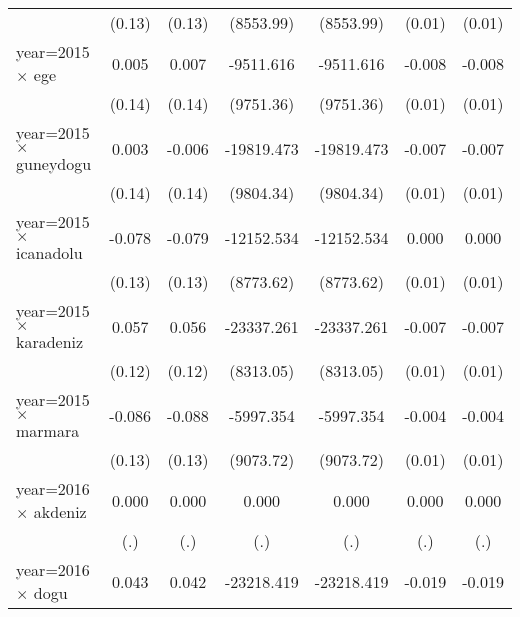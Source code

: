 {\begin{tabular}{l*{6}{c}}
                    &      (0.13)         &      (0.13)         &   (8553.99)         &   (8553.99)         &      (0.01)         &      (0.01)         \\
year=2015 $\times$ ege&       0.005         &       0.007         &   -9511.616         &   -9511.616         &      -0.008         &      -0.008         \\
                    &      (0.14)         &      (0.14)         &   (9751.36)         &   (9751.36)         &      (0.01)         &      (0.01)         \\
year=2015 $\times$ guneydogu&       0.003         &      -0.006         &  -19819.473\sym{*}  &  -19819.473\sym{*}  &      -0.007         &      -0.007         \\
                    &      (0.14)         &      (0.14)         &   (9804.34)         &   (9804.34)         &      (0.01)         &      (0.01)         \\
year=2015 $\times$ icanadolu&      -0.078         &      -0.079         &  -12152.534         &  -12152.534         &       0.000         &       0.000         \\
                    &      (0.13)         &      (0.13)         &   (8773.62)         &   (8773.62)         &      (0.01)         &      (0.01)         \\
year=2015 $\times$ karadeniz&       0.057         &       0.056         &  -23337.261\sym{**} &  -23337.261\sym{**} &      -0.007         &      -0.007         \\
                    &      (0.12)         &      (0.12)         &   (8313.05)         &   (8313.05)         &      (0.01)         &      (0.01)         \\
year=2015 $\times$ marmara&      -0.086         &      -0.088         &   -5997.354         &   -5997.354         &      -0.004         &      -0.004         \\
                    &      (0.13)         &      (0.13)         &   (9073.72)         &   (9073.72)         &      (0.01)         &      (0.01)         \\
year=2016 $\times$ akdeniz&       0.000         &       0.000         &       0.000         &       0.000         &       0.000         &       0.000         \\
                    &         (.)         &         (.)         &         (.)         &         (.)         &         (.)         &         (.)         \\
year=2016 $\times$ dogu&       0.043         &       0.042         &  -23218.419\sym{**} &  -23218.419\sym{**} &      -0.019\sym{*}  &      -0.019\sym{*}  \\

\end{tabular}}
